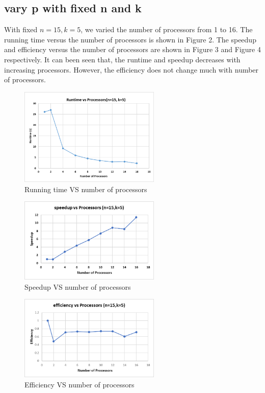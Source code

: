 \documentclass[twoside,12pt]{article}
\begin{document}
\subsection{vary p with fixed n and k}
	With fixed  $ n = 15, k = 5 $, we varied the number of processors from 1 to 16. The running time versus the number of processors is shown in Figure 2. The speedup and efficiency versus the number of processors are shown in Figure 3 and Figure 4 respectively. It can been seen that, the runtime and speedup decreases with increasing processors. However, the efficiency does not change much with number of processors.
	\begin{figure}[H]
		\begin{centering}
		\includegraphics[width=0.6\textwidth]{pVSTime1}
		\caption{Running time VS number of processors}
		\end{centering}
	\end{figure}
    \begin{figure}[H]
    	\begin{centering}
    	\includegraphics[width=0.6\textwidth]{speedupVSp}
    	\caption{Speedup VS number of processors}
    	\end{centering}
    \end{figure}
   
    \begin{figure}[H]
	\begin{centering}
	\includegraphics[width=0.6\textwidth]{effiVSp}
	\caption{Efficiency VS number of processors}
	\end{centering}
    \end{figure}
\end{document}
